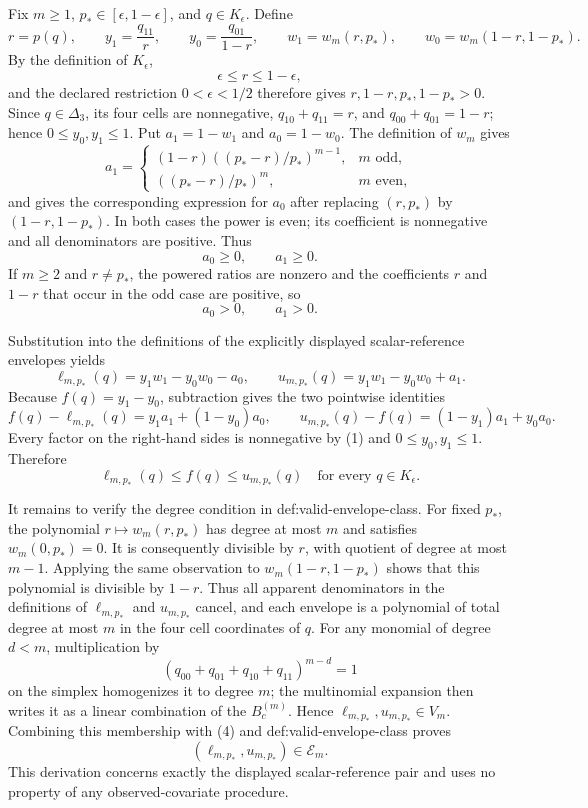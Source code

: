 Fix \(m\geq 1\), \(p_*\in[\epsilon,1-\epsilon]\), and \(q\in K_{\epsilon}\). Define
\[
r=p(q),\qquad y_1=\frac{q_{11}}{r},\qquad y_0=\frac{q_{01}}{1-r},
\qquad w_1=w_m(r,p_*),\qquad w_0=w_m(1-r,1-p_*).
\]
By the definition of \(K_{\epsilon}\),
\[
\epsilon\leq r\leq1-\epsilon,
\]
and the declared restriction \(0<\epsilon<1/2\) therefore gives
\(r,1-r,p_*,1-p_*>0\). Since \(q\in\Delta_3\), its four cells are
nonnegative, \(q_{10}+q_{11}=r\), and \(q_{00}+q_{01}=1-r\); hence
\(0\leq y_0,y_1\leq1\). Put \(a_1=1-w_1\) and \(a_0=1-w_0\). The
definition of \(w_m\) gives
\[
a_1=
\begin{cases}
(1-r)\left((p_*-r)/p_*\right)^{m-1},&m\text{ odd},\\
\left((p_*-r)/p_*\right)^m,&m\text{ even},
\end{cases}
\]
and gives the corresponding expression for \(a_0\) after replacing
\((r,p_*)\) by \((1-r,1-p_*)\). In both cases the power is even; its
coefficient is nonnegative and all denominators are positive. Thus
\[
a_0\geq0,\qquad a_1\geq0.                                      \tag{1}
\]
If \(m\geq2\) and \(r\neq p_*\), the powered ratios are nonzero and the
coefficients \(r\) and \(1-r\) that occur in the odd case are positive, so
\[
a_0>0,\qquad a_1>0.                                             \tag{2}
\]

Substitution into the definitions of the explicitly displayed scalar-reference
envelopes yields
\[
\ell_{m,p_*}(q)=y_1w_1-y_0w_0-a_0,
\qquad
u_{m,p_*}(q)=y_1w_1-y_0w_0+a_1.
\]
Because \(f(q)=y_1-y_0\), subtraction gives the two pointwise identities
\[
f(q)-\ell_{m,p_*}(q)=y_1a_1+(1-y_0)a_0,
\qquad
u_{m,p_*}(q)-f(q)=(1-y_1)a_1+y_0a_0.                             \tag{3}
\]
Every factor on the right-hand sides is nonnegative by (1) and
\(0\leq y_0,y_1\leq1\). Therefore
\[
\ell_{m,p_*}(q)\leq f(q)\leq u_{m,p_*}(q)
\quad\text{for every }q\in K_{\epsilon}.                         \tag{4}
\]

It remains to verify the degree condition in def:valid-envelope-class. For
fixed \(p_*\), the polynomial \(r\mapsto w_m(r,p_*)\) has degree at most
\(m\) and satisfies \(w_m(0,p_*)=0\). It is consequently divisible by
\(r\), with quotient of degree at most \(m-1\). Applying the same observation
to \(w_m(1-r,1-p_*)\) shows that this polynomial is divisible by \(1-r\).
Thus all apparent denominators in the definitions of \(\ell_{m,p_*}\) and
\(u_{m,p_*}\) cancel, and each envelope is a polynomial of total degree at
most \(m\) in the four cell coordinates of \(q\). For any monomial of degree
\(d<m\), multiplication by
\[
(q_{00}+q_{01}+q_{10}+q_{11})^{m-d}=1
\]
on the simplex homogenizes it to degree \(m\); the multinomial expansion then
writes it as a linear combination of the \(B_c^{(m)}\). Hence
\(\ell_{m,p_*},u_{m,p_*}\in V_m\). Combining this membership with (4) and
def:valid-envelope-class proves
\[
(\ell_{m,p_*},u_{m,p_*})\in\mathcal E_m.                          \tag{5}
\]
This derivation concerns exactly the displayed scalar-reference pair and uses
no property of any observed-covariate procedure.

